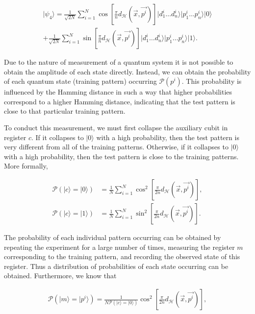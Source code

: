 \begin{align*}
    \vert \psi_4 \rangle = \frac{1}{\sqrt{2N}}\sum\limits_{i=1}^{N} \cos\left[ \frac{\pi}{n}d_\mathcal{H}\left(\Vec{x},\vec{p^i}\right) \right] \vert d_1^i\dots d_n^i\rangle\vert p_{1}^{i}\dots p_{n}^{i}\rangle \vert 0 \rangle \\ + \frac{1}{\sqrt{2N}}\sum\limits_{i=1}^{N} \sin\left[ \frac{\pi}{n}d_\mathcal{H}\left(\Vec{x},\Vec{p^i}\right)\right] \vert d_1^i\dots d_n^i\rangle\vert p_{1}^{i}\dots p_{n}^{i}\rangle \vert 1 \rangle.
\end{align*}

Due to the nature of measurement of a quantum system it is not possible to obtain the amplitude of each state directly. Instead, we can obtain the probability of each quantum state (training pattern) occurring $\mathcal{P}\left( p^i\right)$. This probability is influenced by the Hamming distance in such a way that higher probabilities correspond to a higher Hamming distance, indicating that the test pattern is close to that particular training pattern.

To conduct this measurement, we must first collapse the auxiliary cubit in register $c$. If it collapses to $\vert0\rangle$ with a high probability, then the test pattern is very different from all of the training patterns. Otherwise, if it collapses to $\vert 0 \rangle$ with a high probability, then the test pattern is close to the training patterns. More formally,

\begin{align*}
    \mathcal{P}\left(\vert c \rangle = \vert 0 \rangle \right) &= \frac{1}{N} \sum\limits_{i = 1}^{N} \cos^2 \left[\frac{\pi}{2n} d_\mathcal{H}\left(\Vec{x},\vec{p^i}\right)\right], \\
    \mathcal{P}\left(\vert c \rangle = \vert 1 \rangle \right) &= \frac{1}{N} \sum\limits_{i = 1}^{N} \sin^2 \left[\frac{\pi}{2n} d_\mathcal{H}\left(\Vec{x},\vec{p^i}\right)\right].
\end{align*}

The probability of each individual pattern occurring can be obtained by repeating the experiment for a large number of times, measuring the register $m$ corresponding to the training pattern, and recording the observed state of this register. Thus a distribution of probabilities of each state occurring can be obtained. Furthermore, we know that 

\begin{align*}
    \mathcal{P}\left(\vert m \rangle = \vert p^i \rangle \right) = \frac{1}{N\mathcal{P}\left(\vert c \rangle = \vert 0 \rangle \right)} \cos^2 \left[\frac{\pi}{2n} d_\mathcal{H}\left(\Vec{x},\vec{p^i}\right)\right],    
\end{align*}

